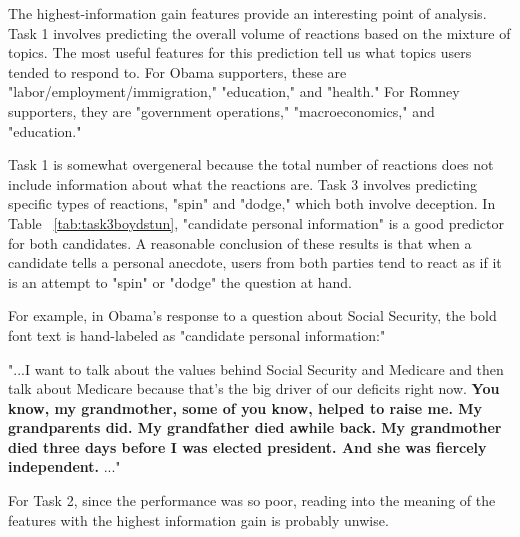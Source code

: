 
The highest-information gain features provide an interesting point of analysis. Task 1 involves predicting the overall volume of reactions based on the mixture of topics. The most useful features for this prediction tell us what topics users tended to respond to. For Obama supporters, these are "labor/employment/immigration," "education," and "health." For Romney supporters, they are "government operations," "macroeconomics," and "education."

Task 1 is somewhat overgeneral because the total number of reactions does not include information about what the reactions are. Task 3 involves predicting specific types of reactions, "spin" and "dodge," which both involve deception. In Table ~\ref{tab:task3boydstun}, "candidate personal information" is a good predictor for both candidates. A reasonable conclusion of these results is that when a candidate tells a personal anecdote, users from both parties tend to react as if it is an attempt to "spin" or "dodge" the question at hand.

For example, in Obama's response to a question about Social Security, the bold font text is hand-labeled as "candidate personal information:"

\footnotesize
\vspace*{.2in}
"...I want to talk about the values behind Social Security and Medicare and then talk about Medicare because that's the big driver of our deficits right now. \textbf{You know, my grandmother, some of you know, helped to raise me. My grandparents did. My grandfather died awhile back. My grandmother died three days before I was elected president. And she was fiercely independent.} ..."
\vspace*{.2in}
\normalsize

For Task 2, since the performance was so poor, reading into the meaning of the features with the highest information gain is probably unwise.
